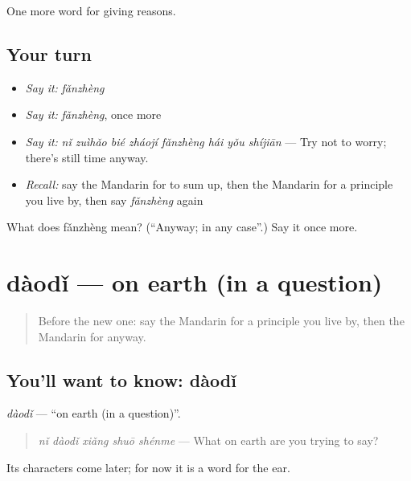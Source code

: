 \begin{grammarlens}[title={What you've built}]
One more word for giving reasons.
\end{grammarlens}

\subsection*{Your turn}
\begin{itemize}
\raggedright
  \item \emph{Say it:} \emph{fǎnzhèng}
  \item \emph{Say it:} \emph{fǎnzhèng}, once more
  \item \emph{Say it:} \emph{nǐ zuìhǎo bié zháojí fǎnzhèng hái yǒu shíjiān} — Try not to worry; there's still time anyway.
  \item \emph{Recall:} say the Mandarin for to sum up, then the Mandarin for a principle you live by, then say \emph{fǎnzhèng} again
\end{itemize}

\begin{tcolorbox}[breakable,colback=teal!4,colframe=teal!35!black,title={Before you move on}]
What does fǎnzhèng mean? (\textquotedblleft{}Anyway; in any case\textquotedblright{}.) Say it once more.
\end{tcolorbox}
\section[dàodǐ]{dàodǐ — on earth (in a question)}

\label{lesson:ZH-C372-daodi}



\begin{quote}
Before the new one: say the Mandarin for a principle you live by, then the Mandarin for anyway.
\end{quote}

\subsection*{You'll want to know: dàodǐ}
\emph{dàodǐ} — \textquotedblleft{}on earth (in a question)\textquotedblright{}.

\begin{quote}
\emph{nǐ dàodǐ xiǎng shuō shénme} — What on earth are you trying to say?
\end{quote}

Its characters come later; for now it is a word for the ear.

